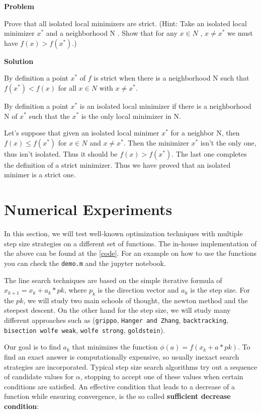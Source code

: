 \documentclass[a4paper,11pt]{article}
\numberwithin{equation}{section} %
\begin{document}
\textbf{Problem}

Prove that all isolated local minimizers are strict. (Hint: Take an isolated local
minimizer $x^{*}$ and a neighborhood N . Show that for any $x \in N$ , $x \neq x^{*}$ we must have $f(x) > f(x^{*})$.)

\textbf{Solution}

By definition a point $x^{*}$ of $f$ is strict when there is a neighborhood N such that $f(x^{*}) < f(x)$ for all $x \in N$ with $x \neq x^{*}$.

By definition a point $x^{*}$ is an isolated local minimizer if there is a neighborhood N of $x^{*}$ such that the $x^{*}$ is the only local minimizer in N.

Let's suppose that given an isolated local minimer $x^{*}$ for a neighbor N, then $f(x) \leq f(x^{*})$ for $x \in N$ and $x \neq x^{*}$. Then the minimizer $x^{*}$ isn't the only one, thus isn't isolated. Thus it should be $f(x) > f(x^{*})$. The last one completes the definition of a strict minimizer. Thus we have proved that an isolated minimer is a strict one.




\section{Numerical Experiments}

In this section, we will test well-known optimization techniques with multiple step size strategies on a different set of functions. 
The in-house implementation of the above can be found at the \ref{code}.
For an example on how to use the functions you can check the \verb|demo.m| and the jupyter notebook.

The line search techniques are based on the simple iterative formula of $x_{k+1} = x_k + a_k*pk$, where $p_k$ is the direction vector and $a_k$ is the step size. For the $pk$, we will study two main schools of thought, the newton method and the steepest descent. On the other hand for the step size, we will study many different approaches such as (\verb|grippo|, \verb|Hanger and Zhang|, \verb|backtracking|, \verb|bisection wolfe weak|, \verb|wolfe strong|, \verb|goldstein|). 

Our goal is to find $a_k$ that minimizes the function $\phi (a) = f(x_k + a*pk)$. To find an exact answer is computationally expensive, so usually inexact search strategies are incorporated. Typical step size search algorithms try out a sequence of candidate values for $\alpha$, stopping to
accept one of these values when certain conditions are satisfied.
An effective condition that leads to a decrease of a function while ensuring convergence, is the so called \textbf{sufficient decrease condition}:
\end{document}
